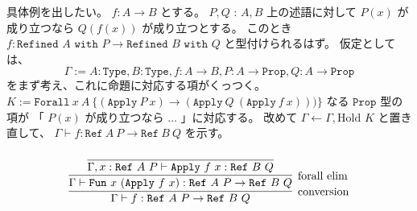 具体例を出したい。
\(f : A \to B\) とする。
\(P , Q\) : \(A , B\) 上の述語に対して \(P(x)\) が成り立つなら \(Q(f(x))\) が成り立つとする。
このとき \(f : \texttt{Refined } A \texttt{ with } P \to \texttt{Refined } B \texttt{ with } Q \) と型付けられるはず。
仮定としては、
  \[\Gamma := A : \texttt{Type} , B : \texttt{Type} , f : A \to B , P : A \to \texttt{Prop} , Q : A \to \texttt{Prop}\]
をまず考え、これに命題に対応する項がくっつく。
\(K := \texttt{Forall} \ x \ A \ \{(\texttt{Apply} \ P \ x) \to (\texttt{Apply} \ Q \ (\texttt{Apply} \ f \ x)))\}\) なる \(\texttt{Prop}\) 型の項が 「 \(P(x)\) が成り立つなら \(\ldots\) 」に対応する。
改めて \(\Gamma \leftarrow \Gamma , \text{Hold } K\) と置き直して、 \(\Gamma \vdash f : \texttt{Ref} \ A \ P \to \texttt{Ref} \ B \ Q\) を示す。

\[
  \infer[\text{conversion}]
  {\Gamma \vdash f : \texttt{Ref} \ A \ P \to \texttt{Ref} \ B \ Q}{
    \infer[\text{forall elim}]{\Gamma \vdash \texttt{Fun} \ x \ (\texttt{Apply} \ f \ x) : \texttt{Ref} \ A \ P \to \texttt{Ref} \ B \ Q}{
      \infer[]{\Gamma , x : \texttt{Ref} \ A \ P \vdash \texttt{Apply} \ f \ x : \texttt{Ref} \ B \ Q}{
        \infer[]{}{}
      }
  }}
\]